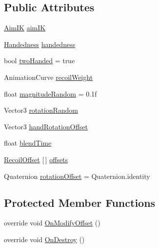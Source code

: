 \subsection*{Public Attributes}
\begin{DoxyCompactItemize}
\item 
\mbox{\hyperlink{class_root_motion_1_1_final_i_k_1_1_aim_i_k}{Aim\+IK}} \mbox{\hyperlink{class_root_motion_1_1_final_i_k_1_1_recoil_a26b42a802adffba58da0ebb7fe1656f5}{aim\+IK}}
\item 
\mbox{\hyperlink{class_root_motion_1_1_final_i_k_1_1_recoil_ad513149868a013010de6e3242480f804}{Handedness}} \mbox{\hyperlink{class_root_motion_1_1_final_i_k_1_1_recoil_a344682d1f1f235cd9a68cbff0901d8a4}{handedness}}
\item 
bool \mbox{\hyperlink{class_root_motion_1_1_final_i_k_1_1_recoil_a99aebb1cf8d8f49f8d8657f2249cad1b}{two\+Handed}} = true
\item 
Animation\+Curve \mbox{\hyperlink{class_root_motion_1_1_final_i_k_1_1_recoil_aa6cb24e065583850cc0a6535ab3d7814}{recoil\+Weight}}
\item 
float \mbox{\hyperlink{class_root_motion_1_1_final_i_k_1_1_recoil_a5fdb27fb079a5ff971dad5fdde3146a8}{magnitude\+Random}} = 0.\+1f
\item 
Vector3 \mbox{\hyperlink{class_root_motion_1_1_final_i_k_1_1_recoil_a605c0935ed400eab2f067a022fdf0ee5}{rotation\+Random}}
\item 
Vector3 \mbox{\hyperlink{class_root_motion_1_1_final_i_k_1_1_recoil_a9e4351c5750335bc05f1ea4e100e607c}{hand\+Rotation\+Offset}}
\item 
float \mbox{\hyperlink{class_root_motion_1_1_final_i_k_1_1_recoil_a4af9b25037935e62dbc15dee44618b94}{blend\+Time}}
\item 
\mbox{\hyperlink{class_root_motion_1_1_final_i_k_1_1_recoil_1_1_recoil_offset}{Recoil\+Offset}} \mbox{[}$\,$\mbox{]} \mbox{\hyperlink{class_root_motion_1_1_final_i_k_1_1_recoil_ac6a0ebd7ad45f6cc1faf2ec282a63e73}{offsets}}
\item 
Quaternion \mbox{\hyperlink{class_root_motion_1_1_final_i_k_1_1_recoil_a0c52b6e36283407c5d6e7bc0e79f0a16}{rotation\+Offset}} = Quaternion.\+identity
\end{DoxyCompactItemize}
\subsection*{Protected Member Functions}
\begin{DoxyCompactItemize}
\item 
override void \mbox{\hyperlink{class_root_motion_1_1_final_i_k_1_1_recoil_ab90e5603561322c91818665cc301d38a}{On\+Modify\+Offset}} ()
\item 
override void \mbox{\hyperlink{class_root_motion_1_1_final_i_k_1_1_recoil_a3835ead88696a858c864e7884b269478}{On\+Destroy}} ()
\end{DoxyCompactItemize}
